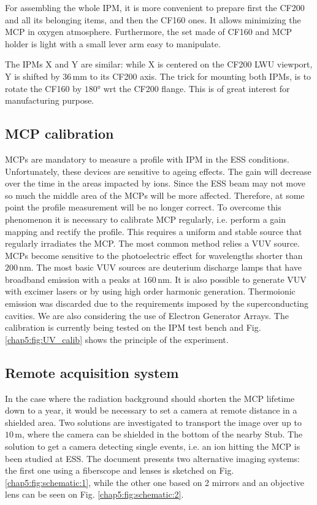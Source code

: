 \begin{refsection}
  For assembling the whole IPM, it is more convenient to prepare first the CF200 and all its belonging items, and then the CF160 ones. It allows minimizing the MCP in oxygen atmosphere. Furthermore, the set made of CF160 and MCP holder is light with a small lever arm easy to manipulate.

  The IPMs X and Y are similar: while X is centered on the CF200 LWU viewport, Y is shifted by $36\,\mathrm{mm}$ to its CF200 axis. The trick for mounting both IPMs, is to rotate the CF160 by $180°$ wrt the CF200 flange. This is of great interest for manufacturing purpose.

  \subsection{MCP calibration}

  
  MCPs are mandatory to measure a profile with IPM in the ESS conditions. Unfortunately, these devices are sensitive to ageing effects. The gain will decrease over the time in the areas impacted by ions. Since the ESS beam may not move so much the middle area of the MCPs will be more affected. Therefore, at some point the profile measurement will be no longer correct. To overcome this phenomenon it is necessary to calibrate MCP regularly, i.e. perform a gain mapping and rectify the profile. This requires a uniform and stable source that regularly irradiates the MCP. The most common method relies a VUV source. MCPs become sensitive to the photoelectric effect for wavelengths shorter than $200\,\mathrm{nm}$. The most basic VUV sources are deuterium discharge lamps that have broadband emission with a peaks at $160\,\mathrm{nm}$. It is also possible to generate VUV with excimer lasers or by using high order harmonic generation. Thermoionic emission was discarded due to the requirements imposed by the superconducting cavities. We are also considering the use of Electron Generator Arrays. The calibration is currently being tested on the IPM test bench and Fig. \ref{chap5:fig:UV_calib} shows the principle of the experiment.

  \subsection{Remote acquisition system}
  In the case where the radiation background should shorten the MCP lifetime down to a year, it would be necessary to set a camera at remote distance in a shielded area. Two solutions are investigated to transport the image over up to $10\,\mathrm{m}$, where the camera can be shielded in the bottom of the nearby Stub. The solution to get a camera detecting single events, i.e. an ion hitting the MCP is been studied at ESS. The document presents two alternative imaging systems: the first one using a fiberscope and lenses is sketched on Fig. \ref{chap5:fig:schematic:1}, while the other one based on 2 mirrors and an objective lens can be seen on Fig. \ref{chap5:fig:schematic:2}.


\end{refsection}
